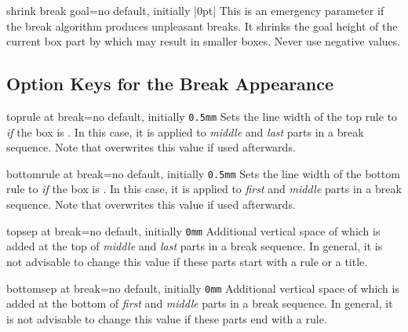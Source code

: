 \begin{docTcbKey}{shrink break goal}{=}{no default, initially |0pt|}
  This is an emergency parameter if the break algorithm produces unpleasant
  breaks. It shrinks the goal height of the current box part by 
  which may result in smaller boxes. Never use negative values.
\end{docTcbKey}


\clearpage
\subsection{Option Keys for the Break Appearance}

\begin{docTcbKey}{toprule at break}{=}{no default, initially \texttt{0.5mm}}
  Sets the line width of the top rule to  \emph{if} the box is .
  In this case, it is applied to \emph{middle} and \emph{last} parts in a
  break sequence. Note that  overwrites this value
  if used afterwards.
\end{docTcbKey}


\begin{docTcbKey}{bottomrule at break}{=}{no default, initially \texttt{0.5mm}}
  Sets the line width of the bottom rule to  \emph{if} the box is .
  In this case, it is applied to \emph{first} and \emph{middle} parts in a
  break sequence. Note that  overwrites this value
  if used afterwards.
\end{docTcbKey}




\begin{docTcbKey}{topsep at break}{=}{no default, initially \texttt{0mm}}
  Additional vertical space of  which is added at the top of
  \emph{middle} and \emph{last} parts in a break sequence. In general,
  it is not advisable to change this value if these parts start with a rule or a title.
\end{docTcbKey}

\begin{docTcbKey}{bottomsep at break}{=}{no default, initially \texttt{0mm}}
  Additional vertical space of  which is added at the bottom of
  \emph{first} and \emph{middle} parts in a break sequence.
  In general, it is not advisable to change this value if these parts end with a rule.
\end{docTcbKey}

